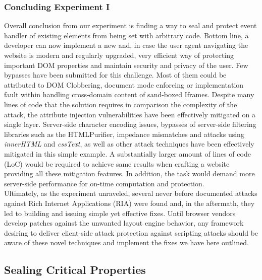       \subsubsection{Concluding Experiment I}
      \label{subsubsubsec:6.6.4.3_concluding_the_experiment}

     Overall conclusion from our experiment is finding a way to seal and protect event handler of existing elements from being set with arbitrary code. Bottom line, a developer can now implement a new and, in case the user agent navigating the website is modern and regularly upgraded, very efficient way of protecting important DOM properties and maintain security and privacy of the user. Few bypasses have been submitted for this challenge. Most of them could be attributed to DOM Clobbering, document mode enforcing or implementation fault within handling cross-domain content of sand-boxed Iframes. Despite many lines of code that the solution requires in comparison the complexity of the attack, the attribute injection vulnerabilities have been effectively mitigated on a single layer. Server-side character encoding issues, bypasses of server-side filtering libraries such as the HTMLPurifier, impedance mismatches and attacks using \textit{innerHTML} and \textit{cssText}, as well as other attack techniques have been effectively mitigated in this simple example. A substantially larger amount of lines of code (LoC) would be required to achieve same results when crafting a website providing all these mitigation features. In addition, the task would demand more server-side performance for on-time computation and protection. \\

     Ultimately, as the experiment unraveled, several never before documented attacks against Rich Internet Applications (RIA) were found and, in the aftermath, they led to building and issuing simple yet effective fixes. Until browser vendors develop patches against the unwanted layout engine behavior, any framework desiring to deliver client-side attack protection against scripting attacks should be aware of these novel techniques and implement the fixes we have here outlined. \\

    \subsection{Sealing Critical Properties}
    \label{subsubsec:6.6.1.sealing_critical_properties}

